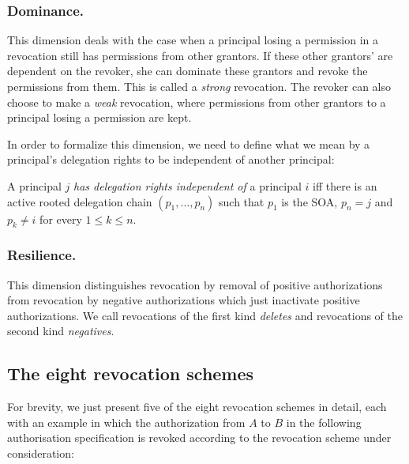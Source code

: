 \documentclass[runningheads]{llncs}
\begin{document}
\subsubsection{Dominance.} 
This dimension deals with the case when a principal losing a permission in a revocation still has permissions from other grantors. 
If these other grantors' are dependent on the revoker, she can dominate these grantors and revoke the permissions from them. This is called a \emph{strong} revocation. The revoker can also choose to make a \emph{weak} revocation, where permissions from other grantors to a principal losing a permission are kept. 

In order to formalize this dimension, we need to define what we mean by a principal's delegation rights to be independent of another principal:
\begin{definition}
 A principal $j$ \emph{has delegation rights independent of} a principal $i$ iff there is an active rooted delegation chain $(p_1,\dots,p_n)$ such that $p_1$ is the SOA, $p_n=j$ and $p_k \neq i$ for every $1 \leq k \leq n$.
\end{definition}


\subsubsection{Resilience.} 
This dimension distinguishes revocation by removal of positive authorizations from revocation by negative authorizations which just inactivate positive authorizations. We call revocations of the first kind \emph{deletes} and revocations of the second kind \emph{negatives}.


\subsection{The eight revocation schemes}
For brevity, we just present five of the eight revocation schemes in detail, each with an example in which the authorization from $A$ to $B$ in the following authorisation specification is revoked according to the revocation scheme under consideration:
\end{document}
